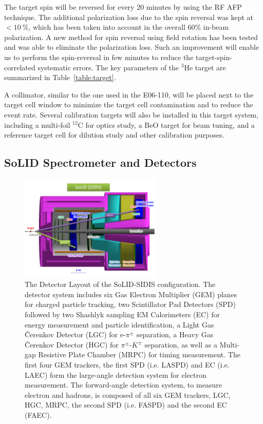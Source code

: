 The target spin will be reversed for every 20 minutes by using the RF AFP
technique. The additional polarization loss due to the spin reversal was kept
at $<10~\%$, which has been taken into account in the overall 60\% in-beam
polarization. A new method for spin reversal using field rotation has been
tested and was able to eliminate the polarization loss. Such an improvement
will enable us to perform the spin-reversal in few minutes to reduce the
target-spin-correlated systematic errors. The key parameters of the
$\mathrm{^{3}He}$ target are summarized in Table~\ref{table:target}.
  
A collimator, similar to the one used in the E06-110, will be placed next to
the target cell window to minimize the target cell contamination and to reduce
the event rate. Several calibration targets will also be installed in this
target system, including a multi-foil $^{12}$C for optics study, a BeO target
for beam tuning, and a reference target cell for dilution study and other
calibration purposes.
  
\subsection {SoLID Spectrometer and Detectors} 

\begin{figure}[!ht]
 \begin{center}
  \includegraphics[width=0.6\textwidth]{./figures/SoLID_SIDIS_setup.pdf}
   \caption[The Detector Layout of the SoLID-SIDIS
     configuration]{\footnotesize{The Detector Layout of the SoLID-SIDIS
       configuration. The detector system includes six Gas Electron Multiplier
       (GEM) planes for charged particle tracking, two Scintillator Pad
       Detectors (SPD) followed by two Shashlyk sampling EM Calorimeters (EC)
       for energy measurement and particle identification, a Light Gas
       \v{C}erenkov Detector (LGC) for e-$\pi^{\pm}$ separation, a Heavy Gas
       \v{C}erenkov Detector (HGC) for $\pi^{\pm}$-$K^{\pm}$ separation, as
       well as a Multi-gap Resistive Plate Chamber (MRPC) for timing
       measurement. The first four GEM trackers, the first SPD (i.e. LASPD) and
       EC (i.e. LAEC) form the large-angle detection system for electron
       measurement. The forward-angle detection system, to measure electron and
       hadrons, is composed of all six GEM trackers, LGC, HGC, MRPC, the second
       SPD (i.e. FASPD) and the second EC (FAEC).}}
   \label{solid_sidis}
 \end{center}
\end{figure}

